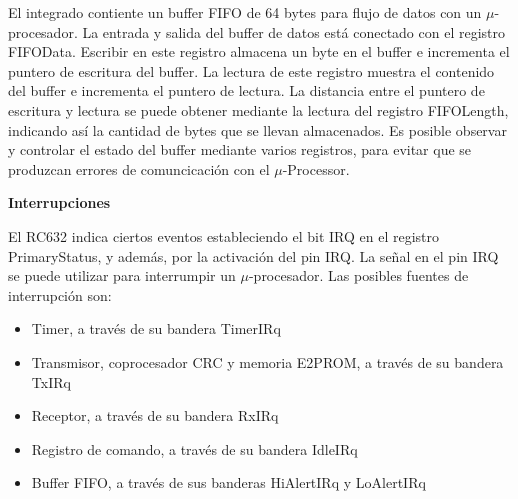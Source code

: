 El integrado contiente un buffer FIFO de 64 bytes para flujo de datos con un $\mu$-procesador.
La entrada y salida del buffer de datos está conectado con el registro FIFOData. Escribir en este registro almacena un byte en el buffer e incrementa el puntero de escritura del buffer. La lectura de este registro muestra el contenido del buffer e incrementa el puntero de lectura. La distancia entre el puntero de escritura y lectura se puede obtener mediante la lectura del registro FIFOLength, indicando así la cantidad de bytes que se llevan almacenados. Es posible observar y controlar el estado del buffer mediante varios registros, para evitar que se produzcan errores de comuncicación con el $\mu$-Processor.

{\bf{Interrupciones}}

El RC632 indica ciertos eventos estableciendo el bit IRQ en el registro PrimaryStatus, y además, por la activación del pin IRQ. La señal en el pin IRQ se puede utilizar para interrumpir un $\mu$-procesador. 
Las posibles fuentes de interrupción son: 

\begin{itemize}

\item Timer, a través de su bandera TimerIRq 
\item Transmisor, coprocesador CRC y memoria E2PROM, a través de su bandera TxIRq 
\item Receptor, a través de su bandera RxIRq 
\item Registro de comando, a través de su bandera IdleIRq 
\item Buffer FIFO, a través de sus banderas HiAlertIRq y LoAlertIRq 

\end{itemize}

